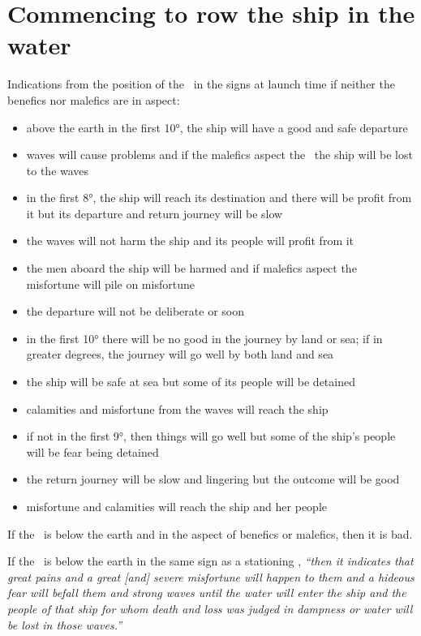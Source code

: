 \section{Commencing to row the ship in the water}
Indications from the position of the \Moon\, in the signs at launch time if neither the benefics nor malefics are in aspect:
\begin{itemize}[topsep=0em,itemsep=0em]
\item[\Aries] above the earth in the first 10°, the ship will have a good and safe departure
\item[\Taurus] waves will cause problems and if the malefics aspect the \Moon\, the ship will be lost to the waves
\item[\Gemini] in the first 8°, the ship will reach its destination and there will be profit from it but its departure and return journey will be slow
\item[\Cancer] the waves will not harm the ship and its people will profit from it
\item[\Leo] the men aboard the ship will be harmed and if malefics aspect the \Moon\,  misfortune  will pile on misfortune
\item[\Virgo] the departure will not be deliberate or soon
\item[\Libra] in the first 10° there will be no good in the journey by land or sea; if in greater degrees, the journey will go well by both land and sea
\item[\Scorpio] the ship will be safe at sea but some of its people will be detained
\item[\Sagittarius] calamities and misfortune from the waves will reach the ship
\item[\Capricorn] if not in the first 9°, then things will go well but some of the ship's people will be fear being detained
\item[\Aquarius] the return journey will be slow and lingering but the outcome will be good
\item[\Pisces] misfortune and calamities will reach the ship and her people
\end{itemize}

If the \Moon\, is below the earth and in the aspect of benefics or malefics, then it is bad.

If the \Moon\, is below the earth in the same sign as a stationing \Saturn, \textsl{``then it indicates that great pains and a great [and] severe misfortune will happen to them and a hideous fear will befall them and strong waves until the water will enter the ship and the people of that ship for whom death and loss was judged in dampness or water will be lost in those waves.''}


